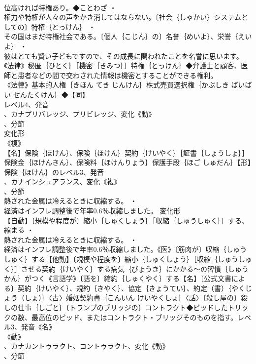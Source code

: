 \documentclass[8pt]{extreport}
\begin{document}
\begin{CJK}{UTF8}{min}
\\	位高ければ特権あり。◆ことわざ ・
\\	権力や特権が人々の声をかき消してはならない。〔社会｛しゃかい｝システムとしての〕特権｛とっけん｝ ・
\\	その国はまだ特権社会である。〔個人｛こじん｝の〕名誉｛めいよ｝、栄誉｛えいよ｝ ・
\\	彼はとても賢い子どもですので、その成長に関われたことを名誉に思います。《法律》秘匿｛ひとく｝［機密｛きみつ｝］特権｛とっけん｝◆弁護士と顧客、医師と患者などの間で交わされた情報は機密とすることができる権利。
\\	《法律》基本的人権｛きほん てき じんけん｝株式売買選択権｛かぶしき ばいばい せんたくけん｝◆【同】
\\	レベル4、発音
\\	、カナプリバレッジ、プリビレッジ、変化《動》
\\	、分節
\\	変化形 
\\	《複》
\\	【名】保険｛ほけん｝、保険｛ほけん｝契約｛けいやく｝［証書｛しょうしょ｝］保険金｛ほけんきん｝、保険料｛ほけんりょう｝保護手段｛ほご しゅだん｝【形】保険｛ほけん｝のレベル3、発音
\\	、カナインシュアランス、変化《複》
\\	、分節
\\	熱された金属は冷えるときに収縮する。 ・
\\	経済はインフレ調整後で年率0.6％収縮しました。	変化形 
\\	【自動】〔規模や程度が〕縮小｛しゅくしょう｝［収縮｛しゅうしゅく｝］する、縮まる ・
\\	熱された金属は冷えるときに収縮する。 ・
\\	経済はインフレ調整後で年率0.6％収縮しました。《医》〔筋肉が〕収縮｛しゅうしゅく｝する【他動】〔規模や程度を〕縮小｛しゅくしょう｝［収縮｛しゅうしゅく｝］させる契約｛けいやく｝する病気｛びょうき｝にかかる～の習慣｛しゅうかん｝がつく《言語学》〔語を〕縮約｛しゅくやく｝する【名】〔公式文書による〕契約｛けいやく｝、規約｛きやく｝、協定｛きょうてい｝、約定（書）｛やくじょう（しょ）｝〈古〉婚姻契約書｛こんいん けいやくしょ｝〈話〉〔殺し屋の〕殺しの仕事｛しごと｝〔トランプのブリッジの〕コントラクト◆ビッドしたトリックの数、最高位のビッド、またはコントラクト・ブリッジそのものを指す。レベル3、発音《名》
\\	《動》
\\	、カナカントゥラクト、コントゥラクト、変化《動》
\\	、分節

\end{CJK}
\end{document}
